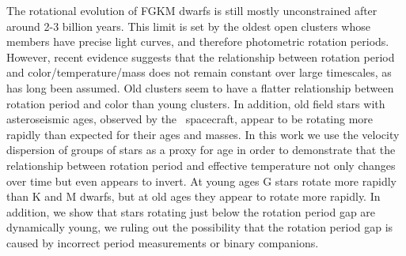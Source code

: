 


The rotational evolution of FGKM dwarfs is still mostly unconstrained after
around 2-3 billion years.
This limit is set by the oldest open clusters whose members have precise light
curves, and therefore photometric rotation periods.
However, recent evidence suggests that the relationship between rotation
period and color/temperature/mass does not remain constant over large
timescales, as has long been assumed.
Old clusters seem to have a flatter relationship between rotation period and
color than young clusters.
In addition, old field stars with asteroseismic ages, observed by the \kepler\
spacecraft, appear to be rotating more rapidly than expected for their ages
and masses.
In this work we use the velocity dispersion of groups of stars as a proxy for
age in order to demonstrate that the relationship between rotation period and
effective temperature not only changes over time but even appears to invert.
At young ages G stars rotate more rapidly than K and M dwarfs, but at old ages
they appear to rotate more rapidly.
In addition, we show that stars rotating just below the rotation period gap
are dynamically young, we ruling out the possibility that the rotation period
gap is caused by incorrect period measurements or binary companions.
